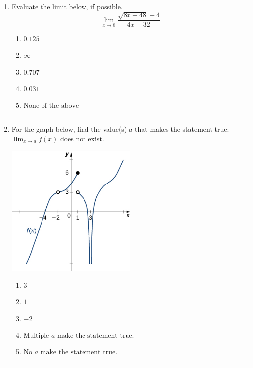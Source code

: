 \documentclass[14pt]{extbook}
\newcommand{\litem}[1]{\item#1\hspace*{-1cm}\rule{\textwidth}{0.4pt}}
\begin{document}
\begin{enumerate}
{\begin{enumerate}[label=\Alph*.]
\end{enumerate} }
\litem{
Evaluate the limit below, if possible.\[ \lim_{x \rightarrow 8} \frac{\sqrt{8x - 48} - 4}{4x - 32} \]\begin{enumerate}[label=\Alph*.]
\item \( 0.125 \)
\item \( \infty \)
\item \( 0.707 \)
\item \( 0.031 \)
\item \( \text{None of the above} \)

\end{enumerate} }
\litem{
For the graph below, find the value(s) $a$ that makes the statement true: $ \displaystyle \lim_{x \rightarrow a} f(x)$ does not exist.
\begin{center}
    \includegraphics[width=0.5\textwidth]{../Figures/evaluateLimitGraphicallyC.png}
\end{center}
\begin{enumerate}[label=\Alph*.]
\item \( 3 \)
\item \( 1 \)
\item \( -2 \)
\item \( \text{Multiple } a \text{ make the statement true}. \)
\item \( \text{No } a \text{ make the statement true}. \)


\end{enumerate}}
\end{enumerate}
\end{document}
